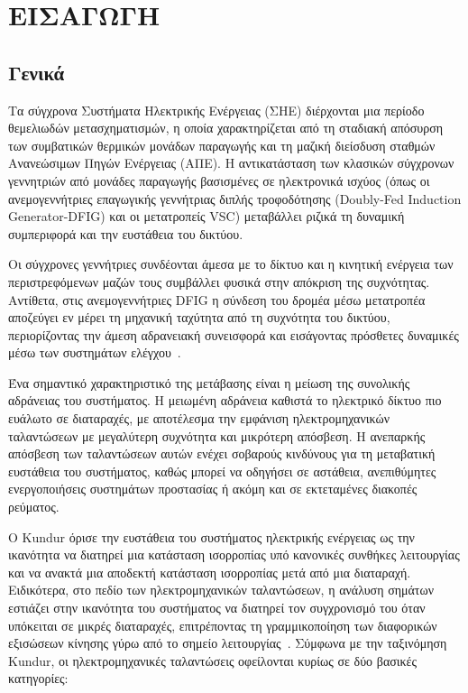 \chapter{ΕΙΣΑΓΩΓΗ}

\section{Γενικά}

Τα σύγχρονα Συστήματα Ηλεκτρικής Ενέργειας (ΣΗΕ) διέρχονται μια περίοδο θεμελιωδών μετασχηματισμών, η οποία χαρακτηρίζεται από τη σταδιακή απόσυρση των συμβατικών θερμικών μονάδων παραγωγής και τη μαζική διείσδυση σταθμών Ανανεώσιμων Πηγών Ενέργειας (ΑΠΕ). Η αντικατάσταση των κλασικών σύγχρονων γεννητριών από μονάδες παραγωγής βασισμένες σε ηλεκτρονικά ισχύος (όπως οι ανεμογεννήτριες επαγωγικής γεννήτριας διπλής τροφοδότησης (Doubly-Fed Induction Generator-DFIG) και οι μετατροπείς VSC) μεταβάλλει ριζικά τη δυναμική συμπεριφορά και την ευστάθεια του δικτύου.

Οι σύγχρονες γεννήτριες συνδέονται άμεσα με το δίκτυο και η κινητική ενέργεια των περιστρεφόμενων μαζών τους συμβάλλει φυσικά στην απόκριση της συχνότητας. Αντίθετα, στις ανεμογεννήτριες DFIG η σύνδεση του δρομέα μέσω μετατροπέα αποζεύγει εν μέρει τη μηχανική ταχύτητα από τη συχνότητα του δικτύου, περιορίζοντας την άμεση αδρανειακή συνεισφορά και εισάγοντας πρόσθετες δυναμικές μέσω των συστημάτων ελέγχου~\cite{kundur1994,zeng2020inertia}.

Ένα σημαντικό χαρακτηριστικό της μετάβασης είναι η μείωση της συνολικής αδράνειας του συστήματος. Η μειωμένη αδράνεια καθιστά το ηλεκτρικό δίκτυο πιο ευάλωτο σε διαταραχές, με αποτέλεσμα την εμφάνιση ηλεκτρομηχανικών ταλαντώσεων με μεγαλύτερη συχνότητα και μικρότερη απόσβεση.
Η ανεπαρκής απόσβεση των ταλαντώσεων αυτών ενέχει σοβαρούς κινδύνους για τη μεταβατική ευστάθεια του συστήματος, καθώς μπορεί να οδηγήσει σε αστάθεια, ανεπιθύμητες ενεργοποιήσεις συστημάτων προστασίας ή ακόμη και σε εκτεταμένες διακοπές ρεύματος.

Ο Kundur όρισε την ευστάθεια του συστήματος ηλεκτρικής ενέργειας ως την ικανότητα να διατηρεί μια κατάσταση ισορροπίας υπό κανονικές συνθήκες λειτουργίας και να ανακτά μια αποδεκτή κατάσταση ισορροπίας μετά από μια διαταραχή. Ειδικότερα, στο πεδίο των ηλεκτρομηχανικών ταλαντώσεων, η ανάλυση σημάτων εστιάζει στην ικανότητα του συστήματος να διατηρεί τον συγχρονισμό του όταν υπόκειται σε μικρές διαταραχές, επιτρέποντας τη γραμμικοποίηση των διαφορικών εξισώσεων κίνησης γύρω από το σημείο λειτουργίας~\cite{kundur2004stability}.
Σύμφωνα με την ταξινόμηση Kundur, οι ηλεκτρομηχανικές ταλαντώσεις οφείλονται κυρίως σε δύο βασικές κατηγορίες:

